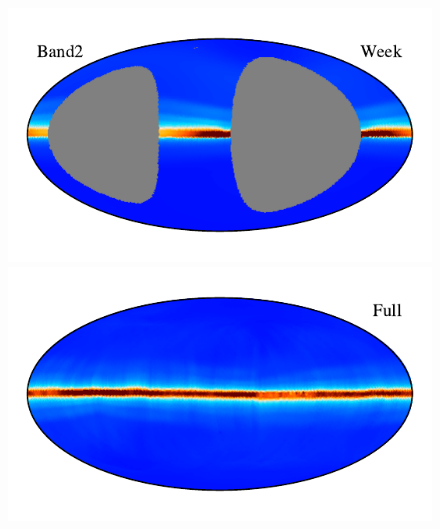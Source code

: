 \documentclass{aa}
\begin{document}
\begin{figure}
    \vspace{-0.6cm}

    \includegraphics[width=0.9\columnwidth]{figs/zodi_comps/zodi_06_band2_week.pdf}\includegraphics[width=0.9\columnwidth]{figs/zodi_comps/zodi_06_band2_full.pdf}

    \vspace{-0.6cm}


\end{figure}
\end{document}
